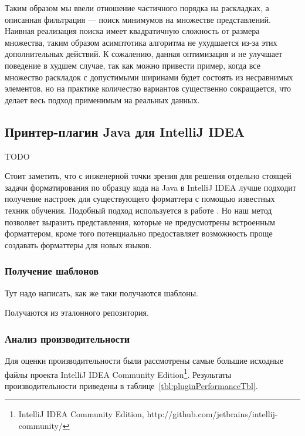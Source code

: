 Таким образом мы ввели отношение частичного порядка на раскладках, а
описанная фильтрация --- поиск минимумов на множестве представлений\cite{poset}.
Наивная реализация поиска имеет квадратичную сложность от размера множества,
таким образом асимптотика алгоритма не ухудшается из-за этих дополнительных
действий. К сожалению, данная оптимизация и не улучшает поведение
в худшем случае, так как
можно привести пример, когда все множество раскладок с допустимыми ширинами
будет состоять из несравнимых элементов, но на практике количество вариантов
существенно сокращается, что делает весь подход применимым на реальных данных.

\subsection{Принтер-плагин Java для IntelliJ IDEA}

TODO

Стоит заметить, что с инженерной точки зрения для решения отдельно стоящей задачи
форматирования по образцу кода на Java в IntelliJ IDEA лучше подходит
получение настроек для существующего форматтера с помощью известных техник обучения.
Подобный подход используется в работе \cite{learning}.
Но наш метод позволяет выразить представления, которые не предусмотрены
встроенным форматтером, кроме того потенциально предоставляет возможность проще
создавать форматтеры для новых языков. 

\subsubsection{Получение шаблонов}
Тут надо написать, как же таки получаются шаблоны.

Получаются из эталонного репозитория.

\subsubsection{Анализ производительности}

Для оценки производительности были рассмотрены самые большие исходные файлы
проекта IntelliJ IDEA Community Edition\footnote{
IntelliJ IDEA Community Edition,
http://github.com/jetbrains/intellij-community/}.
Результаты производительности приведены в
таблице~\ref{tbl:pluginPerformanceTbl}.

